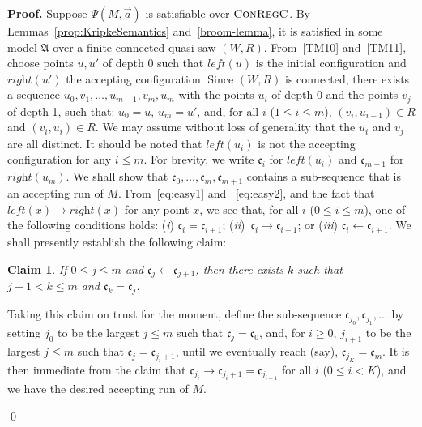 \documentclass{LMCS}
\renewenvironment{proof}{\par\noindent\textbf{Proof.}}{\mbox{}\qed\par\medskip}
\theoremstyle{plain}
\newtheorem{claim}[thm]{Claim}
\newcommand{\ConR}{\textsc{ConRegC}}
\begin{document}
\begin{proof}
Suppose $\Psi(M,\vec{a})$ is satisfiable over $\ConR$.  By
Lemmas~\ref{prop:KripkeSemantics} and~\ref{broom-lemma}, it is
satisfied in some model $\mathfrak{A}$ over a finite connected  quasi-saw
$(W,R)$. From~\eqref{TM10} and~\eqref{TM11}, choose points $u, u'$ of
depth 0 such that $\textit{left}(u)$ is the initial configuration and
$\textit{right}(u')$ the accepting configuration. Since $(W,R)$ is
connected, there exists a sequence $u_0, v_1, \ldots, u_{m-1}, v_m,
u_m$ with the points $u_i$ of depth 0 and the points $v_j$ of depth 1, such that:
$u_0 = u$, $u_m = u'$, and, for all $i$ ($1 \leq i \leq m$), $(v_i,
u_{i-1}) \in R$ and $(v_i, u_i) \in R$. We may assume without loss of
generality that the $u_i$ and $v_j$ are all distinct.
It should be noted that $\textit{left}(u_i)$ is not
the accepting configuration for any $i \leq m$. For brevity, we write
$\mathfrak c_i$ for $\textit{left}(u_i)$ and $\mathfrak{c}_{m+1}$ for $\textit{right}(u_m)$. We shall show that
$\mathfrak c_0, \ldots, \mathfrak c_m, \mathfrak{c}_{m+1}$ contains a sub-sequence that is
an accepting run of $M$. From~\eqref{eq:easy1} and ~\eqref{eq:easy2},
and the fact that $\textit{left}(x) \rightarrow \textit{right}(x)$ for
any point $x$, we see that, for all $i$ ($0 \leq i \leq m$), one of the
following conditions holds: ({\em i}) $\mathfrak c_i = \mathfrak
c_{i+1}$; ({\em ii})~$\mathfrak c_i \rightarrow \mathfrak c_{i+1}$; or
({\em iii}) $\mathfrak c_i \leftarrow \mathfrak c_{i+1}$. We shall presently
establish the following claim:
\begin{claim}\label{claim:TM}
If $0 \leq j \leq m$ and $\mathfrak c_j \leftarrow \mathfrak c_{j+1}$, then there
exists $k$ such that $j+ 1 < k \leq m$ and $\mathfrak c_k = \mathfrak c_j$.
\end{claim}
\noindent Taking this claim on trust for the moment, define the sub-sequence
$\mathfrak c_{j_0}, \mathfrak c_{j_1}, \ldots$ by setting $j_0$ to
be the largest $j \leq m$ such that $\mathfrak c_j = \mathfrak c_0$,
and, for $i \geq 0$, $j_{i+1}$ to be the largest $j \leq m$ such that
$\mathfrak c_j = \mathfrak c_{j_i +1}$, until we eventually reach
(say), $\mathfrak c_{j_K} = \mathfrak c_m$. It is then immediate
from the claim that $\mathfrak c_{j_i} \rightarrow \mathfrak
c_{j_i+1} = \mathfrak c_{j_{i+1}}$ for all $i$ ($0 \leq i < K$),
and we have the desired accepting run of $M$.


\end{proof}
\end{document}
